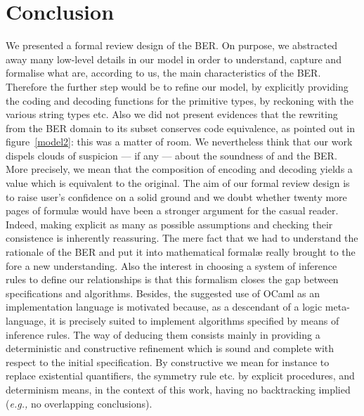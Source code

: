 
\section{Conclusion}

We presented a formal review design of the BER. On purpose, we
abstracted away many low-level details in our model in order to
understand, capture and formalise what are, according to us, the main
characteristics of the BER. Therefore the further step would be to
refine our model, by explicitly providing the coding and decoding
functions for the primitive types, by reckoning with the various
string types etc. Also we did not present evidences that the rewriting
from the BER domain to its \core subset conserves code equivalence, as
pointed out in figure~\ref{model2}: this was a matter of room. We
nevertheless think that our work dispels clouds of suspicion --- if
any --- about the soundness of \ASN and the BER. More precisely, we
mean that the composition of encoding and decoding yields a value
which is equivalent to the original. The aim of our formal review
design is to raise user's confidence on a solid ground and we doubt
whether twenty more pages of formul{\ae} would have been a stronger
argument for the casual reader. Indeed, making explicit as many as
possible assumptions and checking their consistence is inherently
reassuring. The mere fact that we had to understand the rationale of
the BER and put it into mathematical formal{\ae} really brought to the
fore a new understanding. Also the interest in choosing a system of
inference rules to define our relationships is that this formalism
closes the gap between specifications and algorithms. Besides, the
suggested use of OCaml as an implementation language is motivated
because, as a descendant of a logic meta-language, it is precisely
suited to implement algorithms specified by means of inference
rules. The way of deducing them consists mainly in providing a
deterministic and constructive refinement which is sound and complete
with respect to the initial specification. By constructive we mean for
instance to replace existential quantifiers, the symmetry rule etc. by
explicit procedures, and determinism means, in the context of this
work, having no backtracking implied (\emph{e.g.,} no overlapping
conclusions).


